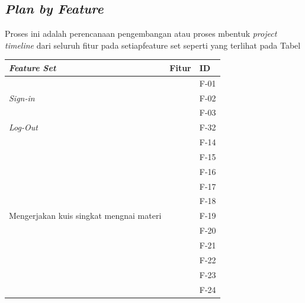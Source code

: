 \subsection{\textit{Plan by Feature}}
Proses ini adalah perencanaan pengembangan atau proses mbentuk \textit{project timeline} dari seluruh fitur pada setiapfeature set seperti yang terlihat pada Tabel
\begin{table}[H]
	\begin{tabular}{|m{3cm}|p{}|p{1.5cm}|}
		\hline
		\centering\textbf{\textit{Feature Set}} & \centering\textbf{Fitur} & \multicolumn{1}{m{1.5cm}|}{\centering \textbf{ID}} \\
		\hline
		\multirow{3}{2.5cm}{\textit{Sign-in}} & & F-01 \\
		\cline{2-3}
		 & & F-02 \\
		\cline{2-3}
		 & & F-03 \\
		\hline
		\multirow{1}{2.5cm}{\textit{Log-Out}} & & F-32 \\
		\hline
		\multirow{11}{2.5cm}{Mengerjakan kuis singkat mengnai materi} & & F-14 \\
		\cline{2-3}
		& & F-15 \\
		\cline{2-3}
		& & F-16 \\
		\cline{2-3}
		& & F-17 \\
		\cline{2-3}
		& & F-18 \\
		\cline{2-3}
		& & F-19 \\
		\cline{2-3}
		& & F-20 \\
		\cline{2-3}
		& & F-21 \\
		\cline{2-3}
		& & F-22 \\
		\cline{2-3}
		& & F-23 \\
		\cline{2-3}
		& & F-24 \\
		\hline
	\end{tabular}
\end{table}
\newpage
